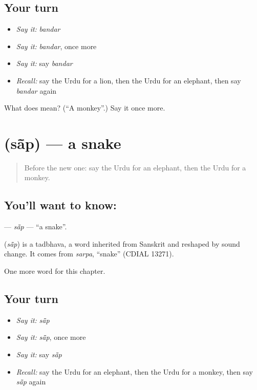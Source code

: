 \subsection*{Your turn}
\begin{itemize}
\raggedright
  \item \emph{Say it:} \emph{bandar}
  \item \emph{Say it:} \emph{bandar}, once more
  \item \emph{Say it:} say \emph{bandar}
  \item \emph{Recall:} say the Urdu for a lion, then the Urdu for an elephant, then say \emph{bandar} again
\end{itemize}

\begin{tcolorbox}[breakable,colback=teal!4,colframe=teal!35!black,title={Before you move on}]
What does  mean? (\textquotedblleft{}A monkey\textquotedblright{}.) Say it once more.
\end{tcolorbox}
\section[\texorpdfstring{\ur{سانپ} (sā̃p)}{سانپ (sā̃p)}]{ (sā̃p) — a snake}

\label{lesson:UR-C69-sap}



\begin{quote}
Before the new one: say the Urdu for an elephant, then the Urdu for a monkey.
\end{quote}

\subsection*{You'll want to know: }
\textbf{} — \emph{sā̃p} — \textquotedblleft{}a snake\textquotedblright{}.

\begin{cousinweb}
\textbf{} (\emph{sā̃p}) is a tadbhava, a word inherited from Sanskrit and reshaped by sound change. It comes from \emph{sarpa}, \textquotedblleft{}snake\textquotedblright{} (CDIAL 13271).
\end{cousinweb}

\begin{grammarlens}[title={What you've built}]
One more word for this chapter.
\end{grammarlens}

\subsection*{Your turn}
\begin{itemize}
\raggedright
  \item \emph{Say it:} \emph{sā̃p}
  \item \emph{Say it:} \emph{sā̃p}, once more
  \item \emph{Say it:} say \emph{sā̃p}
  \item \emph{Recall:} say the Urdu for an elephant, then the Urdu for a monkey, then say \emph{sā̃p} again
\end{itemize}

